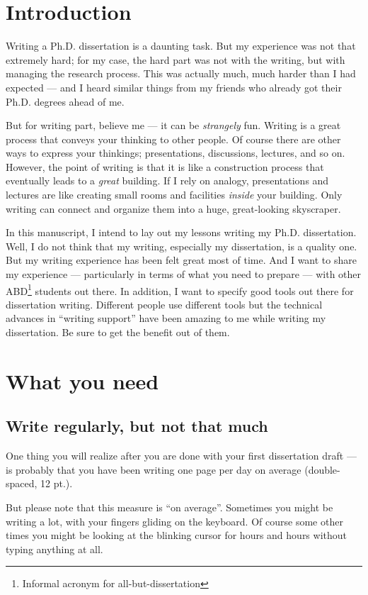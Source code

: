 \documentclass[11pt]{article}
\begin{document}
\section{Introduction}

Writing a Ph.D. dissertation is a daunting task. But my experience
was not that extremely hard; for my case, the hard part was not
with the writing, but with managing the research process. This was
actually much, much harder than I had expected --- and I heard
similar things from my friends who already got their Ph.D. degrees
ahead of me.

But for writing part, believe me --- it can be \emph{strangely}
fun.  Writing is a great process that conveys your thinking to
other people.  Of course there are other ways to express your
thinkings; presentations, discussions, lectures, and so on.
However, the point of writing is that it is like a construction
process that eventually leads to a \emph{great} building.  If I
rely on analogy, presentations and lectures are like creating
small rooms and facilities \emph{inside} your building. Only
writing can connect and organize them into a huge, great-looking
skyscraper.

In this manuscript, I intend to lay out my lessons writing my
Ph.D.  dissertation. Well, I do not think that my writing,
especially my dissertation, is a quality one. But my writing
experience has been felt great most of time. And I want to share
my experience --- particularly in terms of what you need to
prepare --- with other ABD\footnote{Informal acronym for
all-but-dissertation} students out there. In addition, I want to
specify good tools out there for dissertation writing.  Different
people use different tools but the technical advances in ``writing
support'' have been amazing to me while writing my dissertation.
Be sure to get the benefit out of them.

\section{What you need}

\subsection{Write regularly, but not that much}
One thing you will realize after you are done with your first
dissertation draft --- is probably that you have been writing one
page per day on average (double-spaced, 12 pt.).

But please note that this measure is ``on average''. Sometimes you
might be writing a lot, with your fingers gliding on the keyboard.
Of course some other times you might be looking at the blinking
cursor for hours and hours without typing anything at all. 
\end{document}
